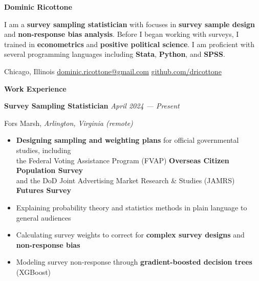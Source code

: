 \documentclass[12pt]{article}
\begin{document}
\centering

{\textbf{\Huge Dominic Ricottone}}

\raggedright
\vspace{.5em}

I am a \textbf{survey sampling statistician} with focuses in \textbf{survey sample design} and \textbf{non-response bias analysis}.
Before I began working with surveys, I trained in \textbf{econometrics} and \textbf{positive political science}.
I am proficient with several programming languages including \textbf{Stata}, \textbf{Python}, and \textbf{SPSS}.



\centering
\vspace{.5em}



 Chicago, Illinois
\enspace
{} \href{mailto:dominic,ricottone@gmail.com}{dominic.ricottone@gmail.com}
\enspace
{} \href{https://github.com/dricottone}{github.com/dricottone}



\raggedright
\vspace{1em}



\textbf{\Large Work Experience} \hrulefill

\vspace{.5em}

\textbf{Survey Sampling Statistician} \hfill \textit{April 2024 --- Present}
\par Fors Marsh, \textit{Arlington, Virginia (remote)}
\begin{itemize}[]
\item \textbf{Designing sampling and weighting plans} for official governmental studies, including
\\ the Federal Voting Assistance Program (FVAP) \textbf{Overseas Citizen Population Survey}
\\ and the DoD Joint Advertising Market Research \& Studies (JAMRS) \textbf{Futures Survey}
\item Explaining probability theory and statistics methods in plain language to general audiences
\item Calculating survey weights to correct for \textbf{complex survey designs} and \textbf{non-response bias}
\item Modeling survey non-response through \textbf{gradient-boosted decision trees} (XGBoost)
\end{itemize}
\end{document}
